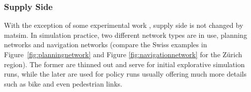 \subsubsection{Supply Side}
With the exception of some experimental work \citep[][]{HorniEtAl_TechRep_IVT_2012}, supply side is not changed by \gls{matsim}.   In simulation practice, two different network types are in use, planning networks and navigation networks (compare the Swiss examples in Figure~\ref{fig:planningnetwork} and Figure \ref{fig:navigationnetwork} for the Zürich region). The former are thinned out and serve for initial explorative simulation runs, while the later are used for policy runs usually offering much more details such as bike and even pedestrian links.


